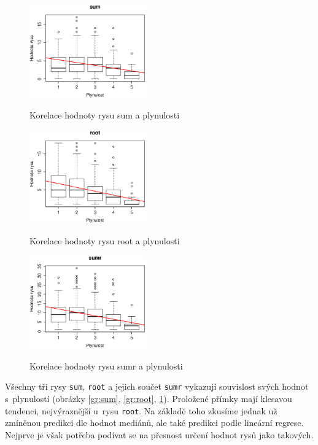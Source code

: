 \documentclass[12pt,a4paper]{report}
\begin{document}
\begin{figure}[!htb]
\begin{center}
  \centering\includegraphics[width=50mm]{./grafy/rysy/sum.eps}
  \caption{Korelace hodnoty rysu sum a plynulosti}\label{gr:sum}
\endminipage\quad
{}
  \centering\includegraphics[width=50mm]{./grafy/rysy/root.eps}
  \caption{Korelace hodnoty rysu root a plynulosti}\label{gr:root}
\endminipage\quad
{}
  \centering\includegraphics[width=50mm]{./grafy/rysy/sumr.eps}
  \caption{Korelace hodnoty rysu sumr a plynulosti}\label{gr:sumr}
\endminipage
\end{center}
\end{figure}




Všechny tři rysy \texttt{sum}, \texttt{root} a jejich součet \texttt{sumr} vykazují souvislost svých hodnot s~plynulostí (obrázky \ref{gr:sum}, \ref{gr:root}, \ref{gr:sumr}). Proložené přímky mají klesavou tendenci, nejvýraznější u~rysu \texttt{root}. Na základě toho zkusíme jednak už zmíněnou predikci dle hodnot mediánů, ale také predikci podle lineární regrese. Nejprve je však potřeba podívat se na přesnost určení hodnot rysů jako takových.
\end{document}
